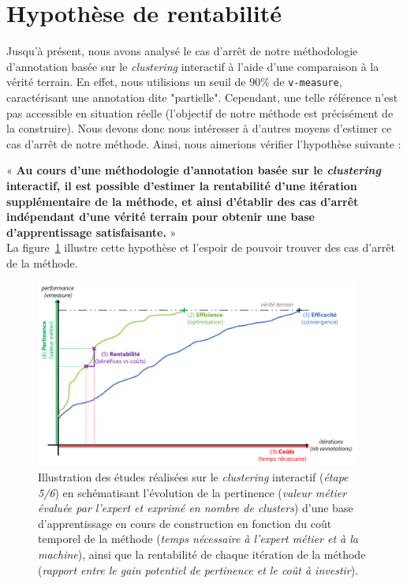 \section{Hypothèse de rentabilité}
\label{section:4.5-HYPOTHESE-RENTABILITE}

	Jusqu'à présent, nous avons analysé le cas d'arrêt de notre méthodologie d'annotation basée sur le \textit{clustering} interactif à l'aide d'une comparaison à la vérité terrain.
	En effet, nous utilisions un seuil de $90$\% de \texttt{v-measure}, caractérisant une annotation dite "partielle".
	Cependant, une telle référence n'est pas accessible en situation réelle (l'objectif de notre méthode est précisément de la construire).
	Nous devons donc nous intéresser à d'autres moyens d'estimer ce cas d'arrêt de notre méthode.
	Ainsi, nous aimerions vérifier l'hypothèse suivante :
	
	\begin{tcolorbox}[
		title=\faVial~\textbf{Hypothèse de rentabilité}~\faVial,
		colback=colorTcolorboxHypothesis!15,
		colframe=colorTcolorboxHypothesis!75,
		width=\linewidth
	]
		« \textbf{
			Au cours d'une méthodologie d'annotation basée sur le \textit{clustering} interactif, il est possible d'estimer la rentabilité d'une itération supplémentaire de la méthode, et ainsi d'établir des cas d'arrêt indépendant d'une vérité terrain pour obtenir une base d’apprentissage satisfaisante.
		} » \\
		
		La figure~\ref{figure:4.5-HYPOTHESE-RENTABILITE} illustre cette hypothèse et l'espoir de pouvoir trouver des cas d'arrêt de la méthode.
		\begin{figure}[H]  %
			\centering
			\includegraphics[width=0.95\textwidth]{figures/hypotheses-05-rentabilite}
			\caption{Illustration des études réalisées sur le \textit{clustering} interactif (\textit{étape 5/6}) en schématisant l'évolution de la pertinence (\textit{valeur métier évaluée par l'expert et exprimé en nombre de clusters}) d'une base d'apprentissage en cours de construction en fonction du coût temporel de la méthode (\textit{temps nécessaire à l'expert métier et à la machine}), ainsi que la rentabilité de chaque itération de la méthode (\textit{rapport entre le gain potentiel de pertinence et le coût à investir}).}
			\label{figure:4.5-HYPOTHESE-RENTABILITE}
		\end{figure}

	\end{tcolorbox}
		
